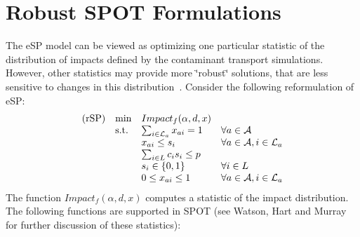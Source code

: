 \section{Robust SPOT Formulations}\label{formulations_formulationsRobust}

The eSP model can be viewed as optimizing one particular statistic of the distribution of impacts defined by the contaminant transport simulations. However, other statistics may provide more \char`\"{}robust\char`\"{} solutions, that are less sensitive to changes in this   distribution~\cite{WatHarMur06a}. Consider the following reformulation of eSP: \[ \label{eqn:rSP} \begin{array}{llll} {\rm (rSP)} & \min & Impact_{f}(\alpha,d,x) &\\ & {\rm s.t.} & \sum_{i\in {\cal L}_a} x_{ai} = 1 &\forall a \in {\cal A}\\ & & x_{ai} \le s_i & \forall a \in {\cal A}, i \in {\cal L}_a\\ & & \sum_{i \in L} c_i s_i \le p&\\ & & s_i \in \{0,1\} & \forall i \in L\\ & & 0 \leq x_{ai} \leq 1 & \forall a \in {\cal A}, i \in {\cal L}_a \end{array} \] The function $Impact_ {f}(\alpha,d,x)$ computes a statistic of the impact distribution. The following functions are supported in  SPOT (see Watson, Hart and Murray~\cite{WatHarMur06a} for further discussion of these statistics):   
